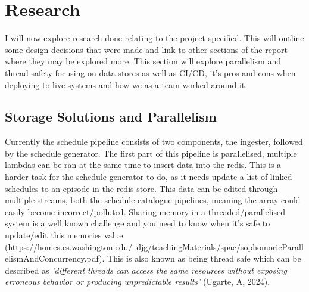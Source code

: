 \section{Research}
  I will now explore research done relating to the project specified. This will outline some design decisions that were made and link to other 
  sections of the report where they may be explored more. This section will explore parallelism and thread safety focusing on data stores as well as 
  CI/CD, it's pros and cons when deploying to live systems and how we as a team worked around it.



  \subsection{Storage Solutions and Parallelism}
  \label{sec:storageSolutions}

  Currently the schedule pipeline consists of two components, the ingester, followed by the schedule generator. The first part of this pipeline is
  parallelised, multiple lambdas can be ran at the same time to insert data into the redis. This is a harder task for the schedule generator to do,
  as it needs update a list of linked schedules to an episode in the redis store. This data can be edited through multiple streams, both the schedule
  catalogue pipelines, meaning the array could easily become incorrect/polluted. Sharing memory in a threaded/parallelised system is a well known 
  challenge and you need to know when it's safe to update/edit this memories value (https://homes.cs.washington.edu/~djg/teachingMaterials/spac/sophomoricParallelismAndConcurrency.pdf).
  This is also known as being thread safe which can be described as \textit{'different threads can access the same resources without exposing erroneous 
  behavior or producing unpredictable results'} (Ugarte, A, 2024).

